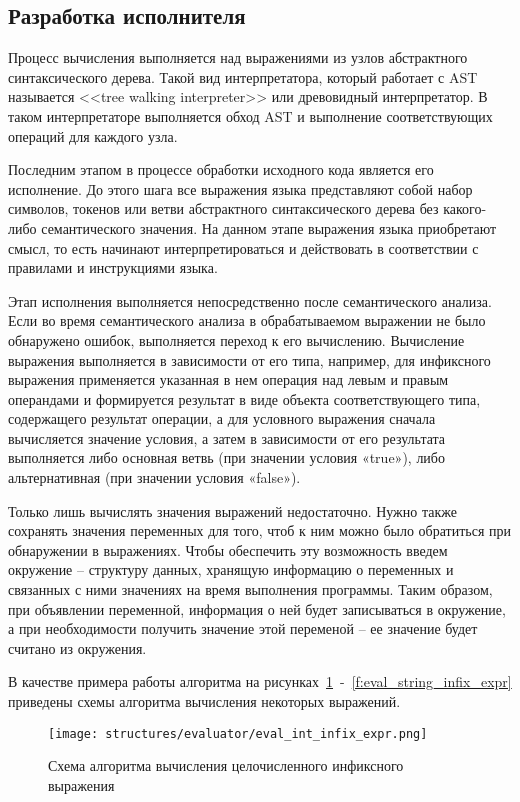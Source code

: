\subsection{Разработка исполнителя}

Процесс вычисления выполняется над выражениями из узлов абстрактного синтаксического дерева.
Такой вид интерпретатора, который работает с AST называется <<tree walking interpreter>> или древовидный интерпретатор.
В таком интерпретаторе выполняется обход AST и выполнение соответствующих операций для каждого узла.

Последним этапом в процессе обработки исходного кода является его исполнение.
До этого шага все выражения языка представляют собой набор символов, токенов или ветви абстрактного синтаксического дерева без какого-либо семантического значения.
На данном этапе выражения языка приобретают смысл, то есть начинают интерпретироваться и действовать в соответствии с правилами и инструкциями языка.

Этап исполнения выполняется непосредственно после семантического анализа.
Если во время семантического анализа в обрабатываемом выражении не было обнаружено ошибок, выполняется переход к его вычислению.
Вычисление выражения выполняется в зависимости от его типа, например,
для инфиксного выражения применяется указанная в нем операция над левым и правым операндами и формируется результат в виде объекта соответствующего типа,
содержащего результат операции, а для условного выражения сначала вычисляется значение условия,
а затем в зависимости от его результата выполняется либо основная ветвь (при значении условия «true»), либо альтернативная (при значении условия «false»).

Только лишь вычислять значения выражений недостаточно.
Нужно также сохранять значения переменных для того, чтоб к ним можно было обратиться при обнаружении в выражениях.
Чтобы обеспечить эту возможность введем окружение – структуру данных, хранящую информацию о переменных и связанных с ними значениях на время выполнения программы.
Таким образом, при объявлении переменной, информация о ней будет записываться в окружение, а при необходимости получить значение этой переменой – ее значение будет считано из окружения.

В качестве примера работы алгоритма на рисунках~\ref{f:eval_int_infix_expr}~-~\ref{f:eval_string_infix_expr} приведены схемы алгоритма вычисления некоторых выражений.

\begin{figure}[!htp]
	\centering
	\vspace{\toppaddingoffigure}
	\texttt{[image: structures/evaluator/eval\_int\_infix\_expr.png]}
	\caption{Схема алгоритма вычисления целочисленного инфиксного выражения}
	\label{f:eval_int_infix_expr}
\end{figure}

